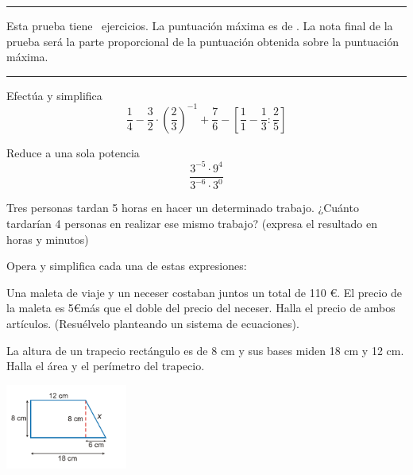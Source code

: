 \documentclass[addpoints,spanish, 12pt,a4paper]{exam}
\begin{document}
\noindent

\rule[2ex]{\textwidth}{2pt}
Esta prueba tiene \numquestions\ ejercicios. La puntuación máxima es de \numpoints. 
La nota final de la prueba será la parte proporcional de la puntuación obtenida sobre la puntuación máxima.

\begin{center}


\addpoints
	\pointtable[h][questions]
\end{center}

\noindent
\rule[2ex]{\textwidth}{2pt}

\begin{questions}

\question[1] Efectúa y simplifica  \[\frac{1}{4}-\frac{3}{2}\cdot\left(\frac{2}{3}\right)^{-1}+\frac{7}{6}-\left[\frac{1}{1}-\frac{1}{3}:\frac{2}{5}\right]\]
\addpoints

\question[1] Reduce a una sola potencia  \[\frac{3^{-5}\cdot9^{4}}{3^{-6}\cdot3^{0}}\]
\addpoints

\question[1] Tres personas tardan 5 horas en hacer un determinado trabajo. ¿Cuánto tardarían 4 personas en realizar ese mismo trabajo? (expresa el resultado en horas y minutos)
\addpoints

\question[2] Opera y simplifica cada una de estas expresiones:
\noaddpoints %
\addpoints


\question[2] Una maleta de viaje y un neceser costaban juntos un total de 110 \euro . El precio de la maleta es 5\euro \space más que el doble del precio del neceser. Halla el precio de ambos artículos. (Resuélvelo planteando un sistema de ecuaciones).
\addpoints

\question[1] La altura de un trapecio rectángulo es de 8 cm y sus bases miden 18 cm y 12 cm. Halla el área y el perímetro del trapecio.

\begin{center}
\includegraphics[width=0.3\textwidth]{trapecio}
\end{center}
    

\end{questions}
\end{document}
